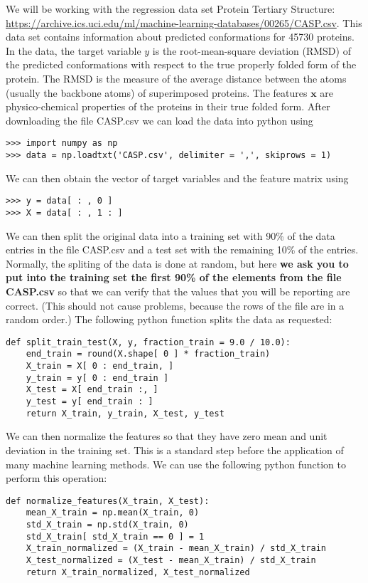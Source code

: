 \documentclass[submit]{harvardml}
\theoremstyle{plain}
\begin{document}
We will be working with the regression data set Protein
Tertiary Structure:
\url{https://archive.ics.uci.edu/ml/machine-learning-databases/00265/CASP.csv}.
This data set contains information about predicted conformations for 45730
proteins. In the data, the target variable $y$ is the root-mean-square
deviation (RMSD) of the predicted conformations with respect to the true properly
folded form of the protein. The RMSD is the measure of the average distance
between the atoms (usually the backbone atoms) of superimposed proteins.
The features $\mathbf{x}$ are
physico-chemical properties of the proteins in their true folded form. After
downloading the file CASP.csv we can load the data into python using
\begin{verbatim}
>>> import numpy as np
>>> data = np.loadtxt('CASP.csv', delimiter = ',', skiprows = 1)
\end{verbatim}
We can then obtain the vector of target variables and the feature matrix using
\begin{verbatim}
>>> y = data[ : , 0 ]
>>> X = data[ : , 1 : ]
\end{verbatim}
We can then split the original data into a training set with 90\% of the data
entries in the file CASP.csv and a test set with the remaining 10\% of the
entries. Normally, the spliting of the data is done at random, but here {\bf we ask
you to put into the training set the first 90\% of the elements from the
file CASP.csv} so that we can verify that the values that you will be reporting are correct.
(This should not cause problems, because the rows of the file are in a random order.)
The following python function splits the data as requested:
\begin{verbatim}
def split_train_test(X, y, fraction_train = 9.0 / 10.0):
    end_train = round(X.shape[ 0 ] * fraction_train)
    X_train = X[ 0 : end_train, ]
    y_train = y[ 0 : end_train ]
    X_test = X[ end_train :, ]
    y_test = y[ end_train : ]
    return X_train, y_train, X_test, y_test
\end{verbatim}
We can then normalize the features so that they have zero mean and unit deviation
in the training set. This is a standard step before the application of many machine
learning methods. We can use the following python function to perform this operation:
\begin{verbatim}
def normalize_features(X_train, X_test):
    mean_X_train = np.mean(X_train, 0)
    std_X_train = np.std(X_train, 0)
    std_X_train[ std_X_train == 0 ] = 1
    X_train_normalized = (X_train - mean_X_train) / std_X_train
    X_test_normalized = (X_test - mean_X_train) / std_X_train
    return X_train_normalized, X_test_normalized
\end{verbatim}
\end{document}
